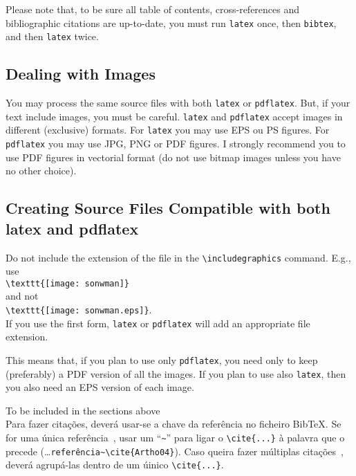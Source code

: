 Please note that, to be sure all table of contents, cross-references and bibliographic citations are up-to-date, you must run \verb!latex! once, then \verb!bibtex!, and then \verb!latex! twice.

\subsection{Dealing with Images} %
\label{sub:dealing_with_images}

You may process the same source files with both \verb!latex! or \verb!pdflatex!. But, if your text include images, you must be careful. \verb!latex! and \verb!pdflatex! accept images in different (exclusive) formats.  For \verb!latex! you may use EPS ou PS figures. For \verb!pdflatex! you may use JPG, PNG or PDF figures.  I strongly recommend you to use PDF figures in vectorial format (do not use bitmap images unless you have no other choice).


\subsection{Creating Source Files Compatible with both latex and pdflatex} %
\label{ssec:creating_source_files_compatible_with_both_latex_and_pdflatex}

Do not include the extension of the file in the \verb!\includegraphics! command. E.g., use\\
\verb!\texttt{[image: sonwman]}!\\
and not\\
\verb!\texttt{[image: sonwman.eps]}!.\\
If you use the first form, \verb!latex! or \verb!pdflatex! will add an appropriate file extension.

This means that, if you plan to use only \verb!pdflatex!, you need only to keep (preferably) a PDF version of all the images. If you plan to use also \verb!latex!, then you also need an EPS version of each image.



\newpage

{\Large To be included in the sections above}\\

Para fazer citações, deverá usar-se a chave da referência no ficheiro BibTeX. Se for uma única referência~\cite{Artho04}, usar um ``\verb!~!'' para ligar o \verb!\cite{...}! à palavra que o precede (\ldots\verb!referência~\cite{Artho04}!).  Caso queira fazer múltiplas citações~\cite{Shavit95,Silberschatz06,Moss85}, deverá agrupá-las dentro de um úinico \verb!\cite{...}!.

